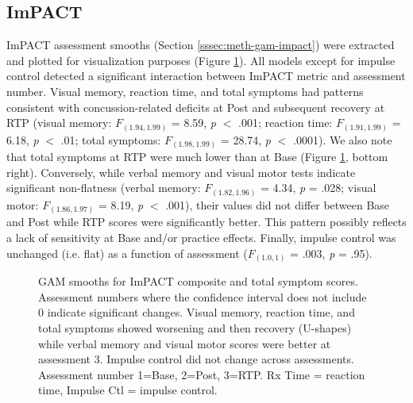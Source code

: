 \documentclass[12pt]{article}
\begin{document}
\subsection{ImPACT}
\label{ssec:res-imp}
ImPACT assessment smooths (Section \ref{sssec:meth-gam-impact}) were extracted and plotted for visualization purposes (Figure \ref{fig:imp-gam}). All models except for impulse control detected a significant interaction between ImPACT metric and assessment number. Visual memory, reaction time, and total symptoms had patterns consistent with concussion-related deficits at Post and subsequent recovery at RTP (visual memory: $F_{(1.94, 1.99)}$ = 8.59, \textit{p} $<$ .001; reaction time: $F_{(1.91, 1.99)}$ = 6.18, \textit{p} $<$ .01; total symptoms: $F_{(1.98, 1.99)}$ = 28.74, \textit{p} $<$ .0001). We also note that total symptoms at RTP were much lower than at Base (Figure \ref{fig:imp-gam}, bottom right). Conversely, while verbal memory and visual motor tests indicate significant non-flatness (verbal memory: $F_{(1.82, 1.96)}$ = 4.34, \textit{p} = .028; visual motor: $F_{(1.86, 1.97)}$ = 8.19, \textit{p} $<$ .001), their values did not differ between Base and Post while RTP scores were significantly better. This pattern possibly reflects a lack of sensitivity at Base and/or practice effects. Finally, impulse control was unchanged (i.e. flat) as a function of assessment ($F_{(1.0, 1)}$ = .003, \textit{p} = .95).

\begin{figure}[H]
	\centering
	\caption{GAM smooths for ImPACT composite and total symptom scores. Assessment numbers where the confidence interval does not include 0 indicate significant changes. Visual memory, reaction time, and total symptoms showed worsening and then recovery (U-shapes) while verbal memory and visual motor scores were better at assessment 3. Impulse control did not change across assessments. Assessment number 1=Base, 2=Post, 3=RTP. Rx Time = reaction time, Impulse Ctl = impulse control.}
	\label{fig:imp-gam}
\end{figure}
\end{document}
